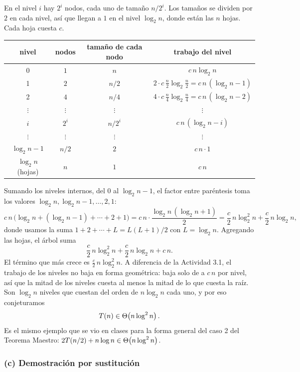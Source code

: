 En el nivel $i$ hay $2^i$ nodos, cada uno de tamaño $n/2^i$. Los tamaños se dividen por
$2$ en cada nivel, así que llegan a $1$ en el nivel $\log_2 n$, donde están las $n$
hojas. Cada hoja cuesta $c$.
\begin{center}
\begin{tabular}{cccc}
  \toprule
  nivel & nodos & tamaño de cada nodo & trabajo del nivel \\
  \midrule
  0 & $1$   & $n$     & $c\,n \log_2 n$ \\[2pt]
  1 & $2$   & $n/2$   & $2 \cdot c\,\frac{n}{2} \log_2 \frac{n}{2} = c\,n\,(\log_2 n - 1)$ \\[4pt]
  2 & $4$   & $n/4$   & $4 \cdot c\,\frac{n}{4} \log_2 \frac{n}{4} = c\,n\,(\log_2 n - 2)$ \\[2pt]
  $\vdots$ & $\vdots$ & $\vdots$ & $\vdots$ \\
  $i$ & $2^i$ & $n/2^i$ & $c\,n\,(\log_2 n - i)$ \\
  $\vdots$ & $\vdots$ & $\vdots$ & $\vdots$ \\
  $\log_2 n - 1$ & $n/2$ & $2$ & $c\,n \cdot 1$ \\[2pt]
  $\log_2 n$ (hojas) & $n$ & $1$ & $c\,n$ \\
  \bottomrule
\end{tabular}
\end{center}
Sumando los niveles internos, del $0$ al $\log_2 n - 1$, el factor entre paréntesis toma
los valores $\log_2 n, \log_2 n - 1, \dots, 2, 1$:
\[
  c\,n\,\big(\log_2 n + (\log_2 n - 1) + \cdots + 2 + 1\big)
  = c\,n \cdot \frac{\log_2 n\,(\log_2 n + 1)}{2}
  = \frac{c}{2}\, n \log_2^2 n + \frac{c}{2}\, n \log_2 n,
\]
donde usamos la suma $1 + 2 + \cdots + L = L(L+1)/2$ con $L = \log_2 n$. Agregando las
hojas, el árbol suma
\[
  \frac{c}{2}\, n \log_2^2 n + \frac{c}{2}\, n \log_2 n + c\,n.
\]
El término que más crece es $\frac{c}{2}\, n\log_2^2 n$. A diferencia de la Actividad
3.1, el trabajo de los niveles no baja en forma geométrica: baja solo de a $c\,n$ por
nivel, así que la mitad de los niveles cuesta al menos la mitad de lo que cuesta la raíz.
Son $\log_2 n$ niveles que cuestan del orden de $n\log_2 n$ cada uno, y por eso
conjeturamos
\[
  T(n) \in \Theta\!\left(n \log^2 n\right).
\]
Es el mismo ejemplo que se vio en clases para la forma general del caso 2 del Teorema
Maestro: $2T(n/2) + n\log n \in \Theta\!\left(n\log^2 n\right)$.

\subsubsection*{(c) Demostración por sustitución}

